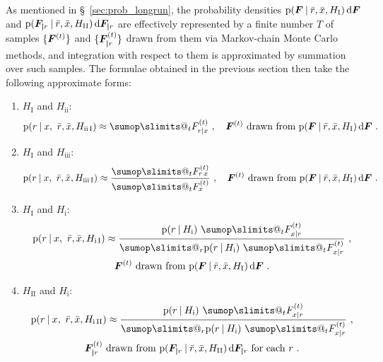 \documentclass[\ifafour a4paper,12pt,\else a5paper,10pt,\fi%
onecolumn,oneside,article,%
british%
]{memoir}
\makeatletter
\theoremstyle{remark}
\theoremstyle{innote}
\def\sum{\DOTSI\sumop\slimits@}
\newcommand*{\di}{\mathrm{d}}%
\DeclarePairedDelimiter\set{\{}{\}}%
\newcommand*{\p}{\mathrm{p}}%
\renewcommand*{\|}[1][]{\nonscript\:#1\vert\nonscript\:\mathopen{}}
\renewcommand*{\=}{\TextOrMath\texteq\eq}
\newcommand*{\sect}{\S}%
\newcommand*{\q}{}%
\DeclareRobustCommand*{\q}{%
  \mathord{\mathpalette\bigcdot@{}}%
}
\newcommand*{\bigcdot@scalefactor}{0.7}
\newcommand*{\bigcdot@widthfactor}{1.5}
\newcommand*{\bigcdot@}[2]{%
  \sbox0{$#1\vcenter{}$}%
  \sbox2{$#1\cdot\m@th$}%
  \hbox to \bigcdot@widthfactor\wd2{%
    \hfil
    \raise\ht0\hbox{%
      \scalebox{\bigcdot@scalefactor}{%
        \lower\ht0\hbox{$#1\bullet\m@th$}%
      }%
    }%
    \hfil
  }%
}
\newcommand*{\ro}{r}
\newcommand*{\xo}{x}
\newcommand*{\rd}{\bar{r}}
\newcommand*{\xd}{\bar{x}}
\newcommand*{\yF}{\bm{F}}
\newcommand*{\yFr}{\yF_{\bm{\mid}r}}
\makeatother
\begin{document}
As mentioned in \sect~\ref{sec:prob_longrun}, the probability densities
$\p(\yF\|\rd,\xd, H_{\textrm{I}})\,\di\yF$ and
$\p(\yFr\|\rd,\xd, H_{\textrm{II}})\,\di\yFr$ are effectively represented
by a finite number $T$ of samples $\set{\yF^{(t)}}$ and $\set{\yFr^{(t)}}$
drawn from them via Markov-chain Monte Carlo methods, and integration with
respect to them is approximated by summation over such samples. The
formulae obtained in the previous section then take the following
approximate forms:
\begin{enumerate}[wide,label=\arabic*'.]
\item\label{item:approx_I_ii} $H_{\textrm{I}}$ and $H_{\textrm{ii}}$:
  \begin{equation}
    \label{eq:approx_post_rx_simple}
    \p(\ro \| \xo,\ \rd,\xd, H_{\textrm{ii\,I}})
    \approx  \sum_{t} F^{(t)}_{\ro\mid\xo} \ ,\quad
    \yF^{(t)}\text{ drawn from }\p(\yF\|\rd,\xd, H_{\textrm{I}})\,\di\yF \ .
\end{equation}

\item\label{item:approx_I_iii} $H_{\textrm{I}}$ and $H_{\textrm{iii}}$:
  \begin{equation}
    \label{eq:approx_post_rx_updated}
        \p(\ro \| \xo,\ \rd,\xd, H_{\textrm{iii\,I}}) \approx
        \frac{\sum_{t} F^{(t)}_{\ro\,\xo}}{
          \sum_{t} F^{(t)}_{\q\xo} } \ ,\quad
    \yF^{(t)}\text{ drawn from }\p(\yF\|\rd,\xd, H_{\textrm{I}})\,\di\yF \ .
  \end{equation}

\item\label{item:approx_I_i} $H_{\textrm{I}}$ and $H_{\textrm{i}}$:
  \begin{multline}
    \label{eq:approx_post_xr_unfactorized}
    \p(\ro \| \xo,\ \rd,\xd, H_{\textrm{i\,I}}) \approx \frac{
    \p(\ro\|  H_{\textrm{i}})\ \sum_{t} F^{(t)}_{\xo\mid\ro}
  }{ \sum_{r}\p(r\|  H_{\textrm{i}})\ \sum_{t} F^{(t)}_{\xo\mid r} } \ ,\\
    \yF^{(t)}\text{ drawn from }\p(\yF\|\rd,\xd, H_{\textrm{I}})\,\di\yF \ .
\end{multline}

\item\label{item:approx_II_i} $H_{\textrm{II}}$ and $H_{\textrm{i}}$:
  \begin{multline}
    \label{eq:approx_post_xr_factorized}
    \p(\ro \| \xo,\ \rd,\xd, H_{\textrm{i\,II}}) \approx \frac{
    \p(\ro\|  H_{\textrm{i}})\ \sum_{t} F^{(t)}_{\xo\mid\ro}
  }{ \sum_{r}\p(r\|  H_{\textrm{i}})\ \sum_{t} F^{(t)}_{\xo\mid r}} \ ,\\
    \yFr^{(t)}\text{ drawn from }\p(\yFr\|\rd,\xd,
    H_{\textrm{II}})\,\di\yFr \text{ for each $r$} \ .
\end{multline}
\end{enumerate}
\end{document}

